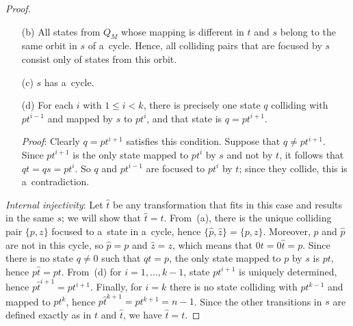 \documentclass{amsart}
\renewcommand{\le}{\leqslant}
\newcommand{\e}[1]{\hat{#1}}
\begin{document}
\begin{proof}
\begin{enumerate}
\noindent\textit{Proof}: Note that $p$ collides with any state in a~cycle of $t$, in particular, with $z$.
The property follows because $s$ differs from $t$ only in the mapping of states $pt^i$ ($0 \le i \le k$) and $0$, and the only state mapped to a~cycle is $p$.

\item[(b)] All states from $Q_M$ whose mapping is different in $t$ and $s$ belong to the same orbit in $s$ of a~cycle.
Hence, all colliding pairs that are focused by $s$ consist only of states from this orbit.

\item[(c)] $s$ has a~cycle.

\item[(d)] For each $i$ with $1 \le i < k$, there is precisely one state $q$ colliding with $pt^{i-1}$ and mapped by $s$ to $pt^i$, and that state is $q=pt^{i+1}$.

\noindent\textit{Proof}: Clearly $q=pt^{i+1}$ satisfies this condition. Suppose that $q \neq pt^{i+1}$. Since $pt^{i+1}$ is the only state mapped to $pt^i$ by $s$ and not by $t$, it follows that $qt = qs = pt^i$. So $q$ and $pt^{i-1}$ are focused to $pt^i$ by $t$; since they collide, this is a~contradiction.
\end{enumerate}

\textit{Internal injectivity}:
Let $\e{t}$ be any transformation that fits in this case and results in the same $s$; we will show that $\e{t}=t$.
From~(a), there is the unique colliding pair $\{p,z\}$ focused to a~state in a~cycle, hence $\{\e{p},\e{z}\} = \{p,z\}$.
Moreover, $p$ and $\e{p}$ are not in this cycle, so $\e{p}=p$ and $\e{z}=z$, which means that $0t = 0\e{t} = p$.
Since there is no state $q \neq 0$ such that $qt=p$, the only state mapped to $p$ by $s$ is $pt$, hence $p\e{t} = pt$.
From~(d) for $i=1,\ldots,k-1$, state $pt^{i+1}$ is uniquely determined, hence $p\e{t}^{i+1} = pt^{i+1}$.
Finally, for $i=k$ there is no state colliding with $pt^{k-1}$ and mapped to $pt^k$, hence $p\e{t}^{k+1} = pt^{k+1} = n-1$.
Since the other transitions in $s$ are defined exactly as in $t$ and $\e{t}$, we have $\e{t}=t$.


\end{proof}
\end{document}
